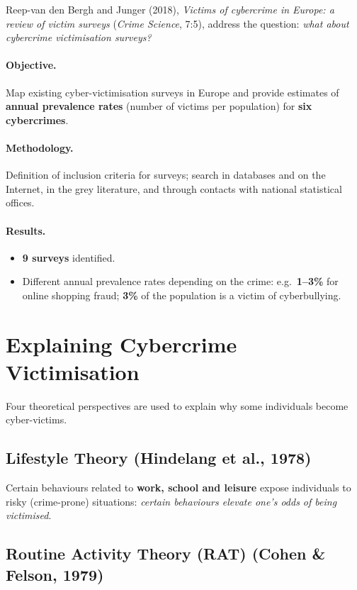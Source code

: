 \documentclass[11pt,a4paper,openany]{report}
\theoremstyle{definition}
\theoremstyle{plain}
\theoremstyle{remark}
\begin{document}
Reep-van den Bergh and Junger (2018), \textit{Victims of cybercrime in Europe: a review of victim surveys} (\textit{Crime Science}, 7:5), address the question: \textit{what about cybercrime victimisation surveys?}

\paragraph{Objective.} Map existing cyber-victimisation surveys in Europe and provide estimates of \textbf{annual prevalence rates} (number of victims per population) for \textbf{six cybercrimes}.

\paragraph{Methodology.} Definition of inclusion criteria for surveys; search in databases and on the Internet, in the grey literature, and through contacts with national statistical offices.

\paragraph{Results.}
\begin{itemize}
    \item \textbf{9 surveys} identified.
    \item Different annual prevalence rates depending on the crime: e.g.\ \textbf{1--3\%} for online shopping fraud; \textbf{3\%} of the population is a victim of cyberbullying.
\end{itemize}

\section{Explaining Cybercrime Victimisation}

Four theoretical perspectives are used to explain why some individuals become cyber-victims.

\subsection{Lifestyle Theory (Hindelang et al., 1978)}

Certain behaviours related to \textbf{work, school and leisure} expose individuals to risky (crime-prone) situations: \textit{certain behaviours elevate one's odds of being victimised}.

\subsection{Routine Activity Theory (RAT) (Cohen \& Felson, 1979)}
\end{document}
